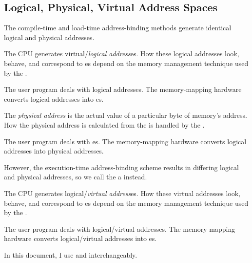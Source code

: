 \subsection{Logical, Physical, Virtual Address Spaces}\label{subsec:Logical_Physical_Virtual_Address_Space}
The compile-time and load-time address-binding methods generate identical logical and physical addresses.

\begin{definition}\label{def:Logical_Address}
  The CPU generates virtual/\emph{logical address}es.
  How these logical addresses look, behave, and correspond to es depend on the memory management technique used by the .

  The user program deals with logical addresses.
  The memory-mapping hardware converts logical addresses into es.
\end{definition}

\begin{definition}\label{def:Physical_Address}
  The \emph{physical address} is the actual value of a particular byte of memory's address.
  How the physical address is calculated from the  is handled by the .

  The user program deals with es.
  The memory-mapping hardware converts logical addresses into physical addresses.
\end{definition}

However, the execution-time address-binding scheme results in differing logical and physical addresses, so we call the  a  instead.

\begin{definition}\label{def:Virtual_Address}
  The CPU generates logical/\emph{virtual address}es.
  How these virtual addresses look, behave, and correspond to es depend on the memory management technique used by the .

  The user program deals with logical/virtual addresses.
  The memory-mapping hardware converts logical/virtual addresses into es.

  \begin{remark}
    In this document, I use  and  interchangeably.
  \end{remark}
\end{definition}

